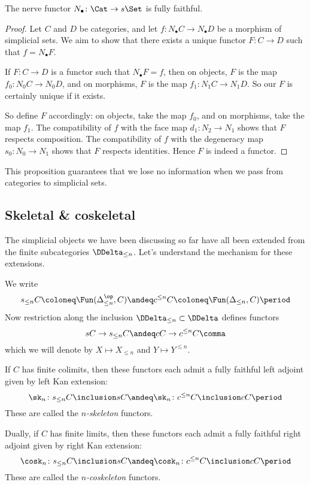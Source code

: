 \begin{proposition}
  The nerve functor $N_\bullet \colon \Cat \to s\Set$ is fully faithful.
\end{proposition}

\begin{proof}
  Let $C$ and $D$ be categories, and let $f \colon N_\bullet C \to N_\bullet D$ be a morphism of simplicial sets.
  We aim to show that there exists a unique functor $F \colon C \to D$ such that $f = N_\bullet F$.

  If $F \colon C \to D$ is a functor such that $N_\bullet F=f$, then
  on objects, $F$ is the map $f_0 \colon N_0C \to N_0D$, and
  on morphisms, $F$ is the map $f_1 \colon N_1C \to N_1D$.
  So our $F$ is certainly unique if it exists.

  So define $F$ accordingly: on objects, take the map $f_0$, and on morphisms, take the map $f_1$.
  The compatibility of $f$ with the face map $d_1 \colon N_2 \to N_1$ shows that $F$ respects composition.
  The compatibility of $f$ with the degeneracy map $s_0 \colon N_0 \to N_1$ shows that $F$ respects identities.
  Hence $F$ is indeed a functor.
\end{proof}

\noindent This proposition guarantees that we lose no information when we pass from categories to simplicial sets.

\subsection{Skeletal \& coskeletal}%
\label{sub:Skeletalandcoskeletal}

The simplicial objects we have been discussing so far have all been extended from the finite subcategories $\DDelta_{\leq n}$.
Let's understand the mechanism for these extensions.

We write
\[
  s_{\leq n}C \coloneq \Fun(\Delta_{\leq n}^{\op}, C)
  \andeq
  c^{\leq n}C \coloneq \Fun(\Delta_{\leq n}, C)
  \period
\]
Now restriction along the inclusion $\DDelta_{\leq n} \subset \DDelta$ defines functors
\[
  sC \to s_{\leq n}C
  \andeq
  cC \to c^{\leq n}C \comma
\]
which we will denote by $X \mapsto X_{\leq n}$ and $Y \mapsto Y^{\leq n}$.

\begin{definition}
  If $C$ has finite colimits, then these functors each admit a fully faithful left adjoint given by left Kan extension:
  \[
    \sk_n \colon s_{\leq n}C \inclusion sC
    \andeq
    \sk_n \colon c^{\leq n}C \inclusion cC \period
  \]
  These are called the \emph{$n$-skeleton} functors.
  
  Dually, if $C$ has finite limits, then these functors each admit a fully faithful right adjoint given by right Kan extension:
  \[
    \cosk_n \colon s_{\leq n}C \inclusion sC
    \andeq
    \cosk_n \colon c^{\leq n}C \inclusion cC \period
  \]
  These are called the \emph{$n$-coskeleton} functors.
\end{definition}

